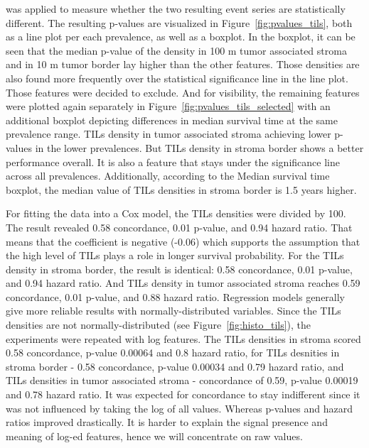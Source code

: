 was applied to measure whether the two resulting event series are statistically different.
The resulting p-values are visualized in Figure~\ref{fig:pvalues_tils}, both as a line plot
per each prevalence, as well as a boxplot. In the boxplot, it can be seen that the median
p-value of the density in 100 \textmu m tumor associated stroma and in 10 \textmu m tumor
border lay higher than the other features. Those densities are also found more frequently
over the statistical significance line in the line plot. Those features were decided to exclude.
And for visibility, the remaining features were plotted again separately in
Figure~\ref{fig:pvalues_tils_selected} with an additional boxplot depicting differences in median
survival time at the same prevalence range. TILs density in tumor associated stroma achieving
lower p-values in the lower prevalences. But TILs density in stroma border shows a better
performance overall. It is also a feature that stays under the significance line across
all prevalences. Additionally, according to the Median survival time boxplot,
the median value of TILs densities in stroma border is 1.5 years higher.

For fitting the data into a Cox model, the TILs densities were divided by 100.
The result revealed 0.58 concordance, 0.01 p-value, and 0.94 hazard ratio.
That means that the coefficient is negative (-0.06) which supports the assumption
that the high level of TILs plays a role in longer survival probability.
For the TILs density in stroma border, the result is identical: 0.58 concordance,
0.01 p-value, and 0.94 hazard ratio. And TILs density in tumor associated stroma
reaches 0.59 concordance, 0.01 p-value, and 0.88 hazard ratio.
Regression models generally give more reliable results with normally-distributed variables.
Since the TILs densities are not normally-distributed (see Figure~\ref{fig:histo_tils}),
the experiments were repeated with log features. The TILs densities in stroma scored
0.58 concordance, p-value 0.00064 and 0.8 hazard ratio, for TILs desnities in stroma border - 0.58
concordance, p-value 0.00034 and 0.79 hazard ratio, and TILs densities in tumor
associated stroma - concordance of 0.59, p-value 0.00019 and 0.78 hazard ratio.
It was expected for concordance to stay indifferent since it was not influenced by
taking the log of all values. Whereas p-values and hazard ratios improved drastically.
It is harder to explain the signal presence and meaning of log-ed features,
hence we will concentrate on raw values.

